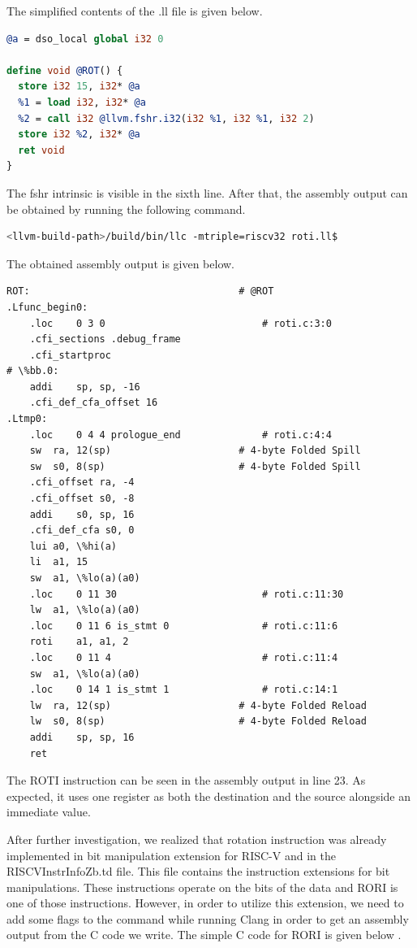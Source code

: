 The simplified contents of the .ll file is given below.

\begin{minipage}{\linewidth}
\begin{lstlisting}[language=llvm,style=nasm]
@a = dso_local global i32 0

define void @ROT() {
  store i32 15, i32* @a
  %1 = load i32, i32* @a
  %2 = call i32 @llvm.fshr.i32(i32 %1, i32 %1, i32 2)
  store i32 %2, i32* @a
  ret void
}
\end{lstlisting}
\end{minipage}

The fshr intrinsic is visible in the sixth line. After that, the assembly output can be obtained by running the following command. 

\begin{lstlisting}[language=Bash]
<llvm-build-path>/build/bin/llc -mtriple=riscv32 roti.ll$
\end{lstlisting}

The obtained assembly output is given below.

\begin{lstlisting}
ROT:                                    # @ROT
.Lfunc_begin0:
	.loc	0 3 0                           # roti.c:3:0
	.cfi_sections .debug_frame
	.cfi_startproc
# \%bb.0:
	addi	sp, sp, -16
	.cfi_def_cfa_offset 16
.Ltmp0:
	.loc	0 4 4 prologue_end              # roti.c:4:4
	sw	ra, 12(sp)                      # 4-byte Folded Spill
	sw	s0, 8(sp)                       # 4-byte Folded Spill
	.cfi_offset ra, -4
	.cfi_offset s0, -8
	addi	s0, sp, 16
	.cfi_def_cfa s0, 0
	lui	a0, \%hi(a)
	li	a1, 15
	sw	a1, \%lo(a)(a0)
	.loc	0 11 30                         # roti.c:11:30
	lw	a1, \%lo(a)(a0)
	.loc	0 11 6 is_stmt 0                # roti.c:11:6
	roti	a1, a1, 2
	.loc	0 11 4                          # roti.c:11:4
	sw	a1, \%lo(a)(a0)
	.loc	0 14 1 is_stmt 1                # roti.c:14:1
	lw	ra, 12(sp)                      # 4-byte Folded Reload
	lw	s0, 8(sp)                       # 4-byte Folded Reload
	addi	sp, sp, 16
	ret
\end{lstlisting}

The ROTI instruction can be seen in the assembly output in line 23. As expected, it uses one register as both  the destination and the source alongside an immediate value.

 After further investigation, we realized that rotation instruction was already implemented in bit manipulation extension for RISC-V and in the RISCVInstrInfoZb.td file. This file contains the instruction extensions for bit manipulations. These instructions operate on the bits of the data and RORI is one of those instructions. However, in order to utilize this extension, we need to add some flags to the command while running Clang in order to get an assembly output from the C code we write. The simple C code for RORI is given below .

